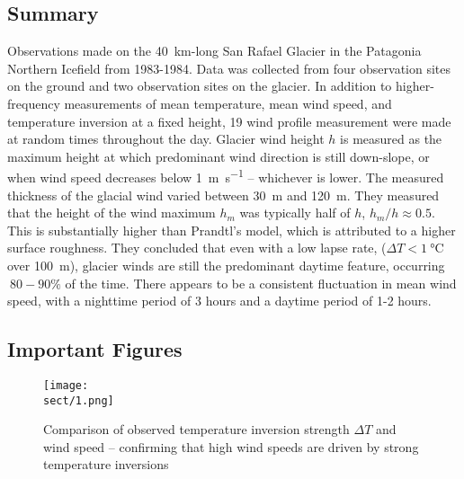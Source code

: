 \documentclass{article}
\begin{document}
\subsection*{Summary}
Observations made on the 40~km-long San Rafael Glacier in the Patagonia Northern Icefield from 1983-1984. Data was collected from four observation sites on the ground and two observation sites on the glacier. 
In addition to higher-frequency measurements of mean temperature, mean wind speed, and temperature inversion at a fixed height, 19 wind profile measurement were made at random times throughout the day. 
Glacier wind height \(h\) is measured as the maximum height at which predominant wind direction is still down-slope, or when wind speed decreases below \SI{1}{\m\per\s} -- whichever is lower. The measured thickness of the glacial wind varied between \SI{30}{\m} and \SI{120}{\m}. 
They measured that the height of the wind maximum \(h_m\) was typically half of \(h\), \(h_m/h\approx0.5\). This is substantially higher than Prandtl's model, which is attributed to a higher surface roughness. They concluded that even with a low lapse rate, (\(\Delta T<\SI{1}{\celsius}\) over \SI{100}{\m}), glacier winds are still the predominant daytime feature, occurring \(~80-90\%\) of the time. 
There appears to be a consistent fluctuation in mean wind speed, with a nighttime period of 3 hours and a daytime period of 1-2 hours.
\subsection*{Important Figures}
\begin{figure}[ht]
    \centering
    \vspace{-4mm}
    \texttt{[image: \\sect/1.png]}
    \vspace{-4mm}
    \caption{Comparison of observed temperature inversion strength \(\Delta T\) and wind speed -- confirming that high wind speeds are driven by strong temperature inversions}
    \label{f:down}
\end{figure}
\newpage






\printbibliography
% 
% 
\end{document}
